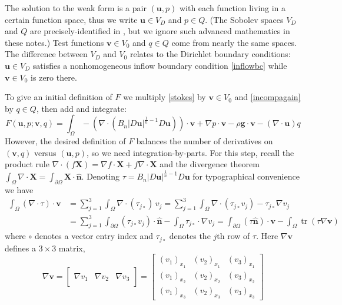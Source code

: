 \documentclass[letterpaper,final,12pt,reqno]{amsart}
\newcommand{\grad}{\nabla}
\newcommand{\trace}{\operatorname{tr}}
\newcommand{\hbn}{\hat{\mathbf{n}}}
\newcommand{\bu}{\mathbf{u}}
\newcommand{\bv}{\mathbf{v}}
\newcommand{\bX}{\mathbf{X}}
\begin{document}
The solution to the weak form is a pair $(\bu,p)$ with each function living in a certain function space, thus we write $\bu\in V_D$ and $p \in Q$.  (The Sobolev spaces $V_D$ and $Q$ are precisely-identified in \cite{JouvetRappaz2011}, but we ignore such advanced mathematics in these notes.)  Test functions $\bv\in V_0$ and $q\in Q$ come from nearly the same spaces.  The difference between $V_D$ and $V_0$ relates to the Dirichlet boundary conditions: $\bu\in V_D$ satisfies a nonhomogeneous inflow boundary condition \eqref{inflowbc} while $\bv\in V_0$ is zero there.

To give an initial definition of $F$ we multiply \eqref{stokes} by $\bv\in V_0$ and \eqref{incompagain} by $q\in Q$, then add and integrate:
\begin{equation}
F(\bu,p;\bv,q) = \int_\Omega - \left(\nabla \cdot \left(B_n |D\bu|^{\frac{1}{n} - 1} D\bu\right)\right)\cdot \bv + \nabla p \cdot \bv - \rho \mathbf{g} \cdot \bv - \left(\nabla \cdot \bu\right) q \label{nonfuncone}
\end{equation}
However, the desired definition of $F$ balances the number of derivatives on $(\bv,q)$ versus $(\bu,p)$, so we need integration-by-parts.  For this step, recall the product rule $\nabla \cdot(f\bX) = \grad f\cdot \bX + f \nabla \cdot \bX$ and the divergence theorem $\int_\Omega \nabla \cdot \bX = \int_{\partial \Omega} \bX \cdot \hbn$.  Denoting $\tau = B_n |D\bu|^{\frac{1}{n} - 1} D\bu$ for typographical convenience we have
\begin{align*}
\int_\Omega \left(\nabla \cdot \tau\right)\cdot \bv &= \sum_{j=1}^3 \int_\Omega \nabla \cdot (\tau_{j\circ})\, v_j = \sum_{j=1}^3 \int_\Omega \nabla \cdot (\tau_{j\circ} v_j) - \tau_{j\circ} \nabla v_j \\
  &= \sum_{j=1}^3 \int_{\partial \Omega} (\tau_{j\circ} v_j) \cdot \hbn - \int_\Omega \tau_{j\circ} \cdot \nabla v_j = \int_{\partial \Omega} (\tau \hbn)\cdot \bv - \int_\Omega \trace(\tau \nabla \bv)
\end{align*}
where $\circ$ denotes a vector entry index and $\tau_{j\circ}$ denotes the $j$th row of $\tau$.  Here $\grad\bv$ defines a $3\times 3$ matrix,
\newcommand{\trefthree}[3]{\left[\begin{array}{c|c|c} & & \\ #1 & #2 & #3 \\ & & \end{array}\right]}
    $$\grad \bv = \trefthree{\grad v_1}{\grad v_2}{\grad v_3} = \begin{bmatrix}
    (v_1)_{x_1} & (v_2)_{x_1} & (v_3)_{x_1} \\
    (v_1)_{x_2} & (v_2)_{x_2} & (v_3)_{x_2} \\
    (v_1)_{x_3} & (v_2)_{x_3} & (v_3)_{x_3}
    \end{bmatrix}$$
\end{document}
